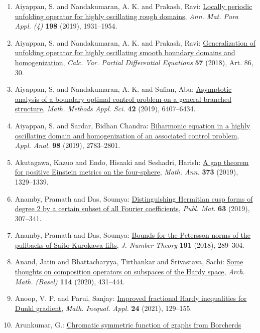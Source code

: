 \begin{enumerate}
\item Aiyappan, S. and Nandakumaran, A. K. and Prakash, Ravi: \href{https://doi.org/10.1007/s10231-019-00848-7}{Locally periodic unfolding operator for highly oscillating
rough domains}, \emph{Ann. Mat. Pura Appl. (4)} {\bf 198} (2019), 1931--1954.
\item Aiyappan, S. and Nandakumaran, A. K. and Prakash, Ravi: \href{https://doi.org/10.1007/s00526-018-1354-6}{Generalization of unfolding operator for highly oscillating
smooth boundary domains and homogenization}, \emph{Calc. Var. Partial Differential Equations} {\bf 57} (2018), Art. 86, 30.
\item Aiyappan, S. and Nandakumaran, A. K. and Sufian, Abu: \href{https://doi.org/10.1002/mma.5748}{Asymptotic analysis of a boundary optimal control problem on a
general branched structure}, \emph{Math. Methods Appl. Sci.} {\bf 42} (2019), 6407--6434.
\item Aiyappan, S. and Sardar, Bidhan Chandra: \href{https://doi.org/10.1080/00036811.2018.1471207}{Biharmonic equation in a highly oscillating domain and
homogenization of an associated control problem}, \emph{Appl. Anal.} {\bf 98} (2019), 2783--2801.
\item Akutagawa, Kazuo and Endo, Hisaaki and Seshadri, Harish: \href{https://doi.org/10.1007/s00208-018-1749-x}{A gap theorem for positive {E}instein metrics on the
four-sphere}, \emph{Math. Ann.} {\bf 373} (2019), 1329--1339.
\item Anamby, Pramath and Das, Soumya: \href{https://doi.org/10.5565/PUBLMAT6311911}{Distinguishing {H}ermitian cusp forms of degree 2 by a certain
subset of all {F}ourier coefficients}, \emph{Publ. Mat.} {\bf 63} (2019), 307--341.
\item Anamby, Pramath and Das, Soumya: \href{https://doi.org/10.1016/j.jnt.2018.03.011}{Bounds for the {P}etersson norms of the pullbacks of
{S}aito-{K}urokawa lifts}, \emph{J. Number Theory} {\bf 191} (2018), 289--304.
\item Anand, Jatin and Bhattacharyya, Tirthankar and Srivastava,
Sachi: \href{https://doi.org/10.1007/s00013-019-01406-6}{Some thoughts on composition operators on subspaces of the
{H}ardy space}, \emph{Arch. Math. (Basel)} {\bf 114} (2020), 431--444.
\item Anoop, V. P. and Parui, Sanjay: \href{https://doi.org/10.7153/mia-2021-24-10}{Improved fractional {H}ardy inequalities for {D}unkl gradient}, \emph{Math. Inequal. Appl.} {\bf 24} (2021), 129--155.
\item Arunkumar, G.: \href{https://doi.org/10.1016/j.jcta.2021.105492}{Chromatic symmetric function of graphs from {B}orcherds
}
\end{enumerate}

